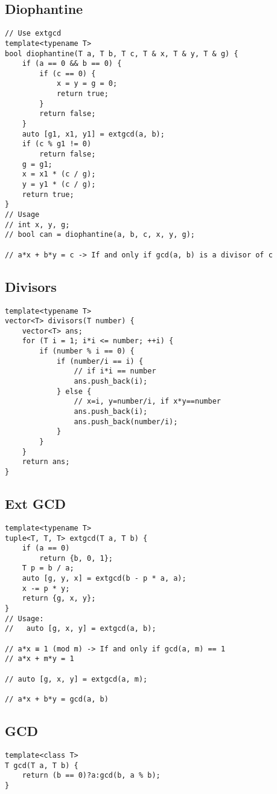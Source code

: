\documentclass[10pt,letterpaper,twocolumn,twosided]{article}
\begin{document}
\subsection{Diophantine}
\begin{lstlisting}
// Use extgcd
template<typename T>
bool diophantine(T a, T b, T c, T & x, T & y, T & g) {
    if (a == 0 && b == 0) {
        if (c == 0) {
            x = y = g = 0;
            return true;
        }
        return false;
    }
    auto [g1, x1, y1] = extgcd(a, b);
    if (c % g1 != 0)
        return false;
    g = g1;
    x = x1 * (c / g);
    y = y1 * (c / g);
    return true;
}
// Usage
// int x, y, g;
// bool can = diophantine(a, b, c, x, y, g);

// a*x + b*y = c -> If and only if gcd(a, b) is a divisor of c
\end{lstlisting}

\subsection{Divisors}
\begin{lstlisting}
template<typename T>
vector<T> divisors(T number) {
    vector<T> ans;
    for (T i = 1; i*i <= number; ++i) {
        if (number % i == 0) {
            if (number/i == i) {
                // if i*i == number
                ans.push_back(i);
            } else {
                // x=i, y=number/i, if x*y==number
                ans.push_back(i);
                ans.push_back(number/i);
            }
        }
    }
    return ans;
}
\end{lstlisting}

\subsection{Ext GCD}
\begin{lstlisting}
template<typename T>
tuple<T, T, T> extgcd(T a, T b) {
    if (a == 0)
        return {b, 0, 1};
    T p = b / a;
    auto [g, y, x] = extgcd(b - p * a, a);
    x -= p * y;
    return {g, x, y};
}
// Usage:
//   auto [g, x, y] = extgcd(a, b);

// a*x ≡ 1 (mod m) -> If and only if gcd(a, m) == 1
// a*x + m*y = 1

// auto [g, x, y] = extgcd(a, m);

// a*x + b*y = gcd(a, b) 
\end{lstlisting}

\subsection{GCD}
\begin{lstlisting}
template<class T>
T gcd(T a, T b) {
    return (b == 0)?a:gcd(b, a % b);
}
\end{lstlisting}
\end{document}
